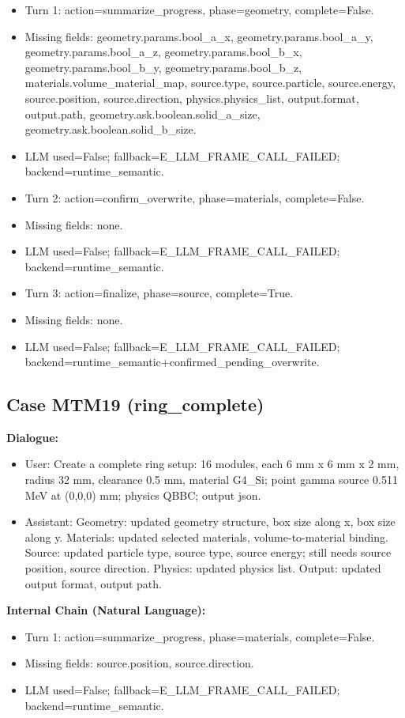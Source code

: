 \documentclass[11pt]{ctexart}
\begin{document}
\begin{itemize}
\item Turn 1: action=summarize\_progress, phase=geometry, complete=False.
\item Missing fields: geometry.params.bool\_a\_x, geometry.params.bool\_a\_y, geometry.params.bool\_a\_z, geometry.params.bool\_b\_x, geometry.params.bool\_b\_y, geometry.params.bool\_b\_z, materials.volume\_material\_map, source.type, source.particle, source.energy, source.position, source.direction, physics.physics\_list, output.format, output.path, geometry.ask.boolean.solid\_a\_size, geometry.ask.boolean.solid\_b\_size.
\item LLM used=False; fallback=E\_LLM\_FRAME\_CALL\_FAILED; backend=runtime\_semantic.
\item Turn 2: action=confirm\_overwrite, phase=materials, complete=False.
\item Missing fields: none.
\item LLM used=False; fallback=E\_LLM\_FRAME\_CALL\_FAILED; backend=runtime\_semantic.
\item Turn 3: action=finalize, phase=source, complete=True.
\item Missing fields: none.
\item LLM used=False; fallback=E\_LLM\_FRAME\_CALL\_FAILED; backend=runtime\_semantic+confirmed\_pending\_overwrite.
\end{itemize}
\subsection{Case MTM19 (ring\_complete)}
\textbf{Dialogue:}
\begin{itemize}
\item User: Create a complete ring setup: 16 modules, each 6 mm x 6 mm x 2 mm, radius 32 mm, clearance 0.5 mm, material G4\_Si; point gamma source 0.511 MeV at (0,0,0) mm; physics QBBC; output json.
\item Assistant: Geometry: updated geometry structure, box size along x, box size along y. Materials: updated selected materials, volume-to-material binding. Source: updated particle type, source type, source energy; still needs source position, source direction. Physics: updated physics list. Output: updated output format, output path.
\end{itemize}
\textbf{Internal Chain (Natural Language):}
\begin{itemize}
\item Turn 1: action=summarize\_progress, phase=materials, complete=False.
\item Missing fields: source.position, source.direction.
\item LLM used=False; fallback=E\_LLM\_FRAME\_CALL\_FAILED; backend=runtime\_semantic.
\end{itemize}
\end{document}
